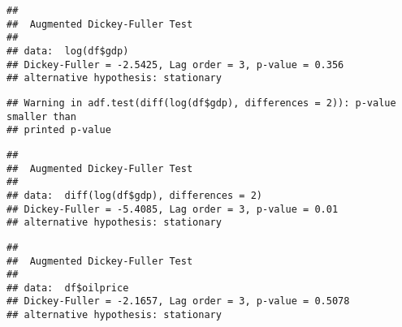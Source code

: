 \documentclass[
]{article}
\newenvironment{Shaded}{\begin{snugshade}}{\end{snugshade}}
\newcommand{\AttributeTok}[1]{\textcolor[rgb]{0.13,0.29,0.53}{#1}}
\newcommand{\CommentTok}[1]{\textcolor[rgb]{0.56,0.35,0.01}{\textit{#1}}}
\newcommand{\DecValTok}[1]{\textcolor[rgb]{0.00,0.00,0.81}{#1}}
\newcommand{\FunctionTok}[1]{\textcolor[rgb]{0.13,0.29,0.53}{\textbf{#1}}}
\newcommand{\NormalTok}[1]{#1}
\newcommand{\SpecialCharTok}[1]{\textcolor[rgb]{0.81,0.36,0.00}{\textbf{#1}}}
\begin{document}
\begin{Shaded}
\end{Shaded}

\begin{verbatim}
## 
##  Augmented Dickey-Fuller Test
## 
## data:  log(df$gdp)
## Dickey-Fuller = -2.5425, Lag order = 3, p-value = 0.356
## alternative hypothesis: stationary
\end{verbatim}

\begin{Shaded}
\end{Shaded}

\begin{verbatim}
## Warning in adf.test(diff(log(df$gdp), differences = 2)): p-value smaller than
## printed p-value
\end{verbatim}

\begin{verbatim}
## 
##  Augmented Dickey-Fuller Test
## 
## data:  diff(log(df$gdp), differences = 2)
## Dickey-Fuller = -5.4085, Lag order = 3, p-value = 0.01
## alternative hypothesis: stationary
\end{verbatim}

\begin{Shaded}
\end{Shaded}

\begin{verbatim}
## 
##  Augmented Dickey-Fuller Test
## 
## data:  df$oilprice
## Dickey-Fuller = -2.1657, Lag order = 3, p-value = 0.5078
## alternative hypothesis: stationary
\end{verbatim}
\end{document}
